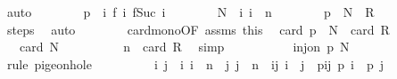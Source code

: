 \begin{isabellebody}
\ auto\isanewline
\ \ \ \ \ \ \isamarkupfalse%
\ {\isacharquery}{\kern0pt}p\ {\isacharequal}{\kern0pt}\ {\isachardoublequoteopen}{\isasymlambda}i{\isachardot}{\kern0pt}\ {\isacharparenleft}{\kern0pt}f\ i{\isacharcomma}{\kern0pt}\ f{\isacharparenleft}{\kern0pt}Suc\ i{\isacharparenright}{\kern0pt}{\isacharparenright}{\kern0pt}{\isachardoublequoteclose}\isanewline
\ \ \ \ \ \ \isamarkupfalse%
\ {\isacharquery}{\kern0pt}N\ {\isacharequal}{\kern0pt}\ {\isachardoublequoteopen}{\isacharbraceleft}{\kern0pt}i{\isachardot}{\kern0pt}\ i\ {\isasymle}\ n{\isacharbraceright}{\kern0pt}{\isachardoublequoteclose}\isanewline
\ \ \ \ \ \ \isamarkupfalse%
\ {\isachardoublequoteopen}{\isacharquery}{\kern0pt}p\ {\isacharbackquote}{\kern0pt}\ {\isacharquery}{\kern0pt}N\ {\isasymsubseteq}\ R{\isachardoublequoteclose}\isanewline
\ \ \ \ \ \ \ \ \isamarkupfalse%
\ steps\ \isamarkupfalse%
\ auto\isanewline
\ \ \ \ \ \ \isamarkupfalse%
\ card{\isacharunderscore}{\kern0pt}mono{\isacharbrackleft}{\kern0pt}OF\ assms{\isacharparenleft}{\kern0pt}{}{\isacharparenright}{\kern0pt}\ this{\isacharbrackright}{\kern0pt}\ \isamarkupfalse%
\ {\isachardoublequoteopen}card\ {\isacharparenleft}{\kern0pt}{\isacharquery}{\kern0pt}p\ {\isacharbackquote}{\kern0pt}\ {\isacharquery}{\kern0pt}N{\isacharparenright}{\kern0pt}\ {\isasymle}\ card\ R{\isachardoublequoteclose}\ \isacommand{{\isachardot}{\kern0pt}}\isamarkupfalse%
\isanewline
\ \ \ \ \ \ \isamarkupfalse%
\ \isamarkupfalse%
\ {\isachardoublequoteopen}{\isasymdots}\ {\isacharless}{\kern0pt}\ card\ {\isacharquery}{\kern0pt}N{\isachardoublequoteclose}\isanewline
\ \ \ \ \ \ \ \ \isamarkupfalse%
\ {\isacartoucheopen}n\ {\isacharequal}{\kern0pt}\ card\ R{\isacartoucheclose}\ \isamarkupfalse%
\ simp\isanewline
\ \ \ \ \ \ \isamarkupfalse%
\ \isamarkupfalse%
\ {\isachardoublequoteopen}{\isasymnot}\ inj{\isacharunderscore}{\kern0pt}on\ {\isacharquery}{\kern0pt}p\ {\isacharquery}{\kern0pt}N{\isachardoublequoteclose}\isanewline
\ \ \ \ \ \ \ \ \isamarkupfalse%
\ {\isacharparenleft}{\kern0pt}rule\ pigeonhole{\isacharparenright}{\kern0pt}\isanewline
\ \ \ \ \ \ \isamarkupfalse%
\ \isamarkupfalse%
\ i\ j\ \ i{\isacharcolon}{\kern0pt}\ {\isachardoublequoteopen}i\ {\isasymle}\ n{\isachardoublequoteclose}\ \ j{\isacharcolon}{\kern0pt}\ {\isachardoublequoteopen}j\ {\isasymle}\ n{\isachardoublequoteclose}\ \ ij{\isacharcolon}{\kern0pt}\ {\isachardoublequoteopen}i\ {\isasymnoteq}\ j{\isachardoublequoteclose}\ \ pij{\isacharcolon}{\kern0pt}\ {\isachardoublequoteopen}{\isacharquery}{\kern0pt}p\ i\ {\isacharequal}{\kern0pt}\ {\isacharquery}{\kern0pt}p\ j{\isachardoublequoteclose}\isanewline

\end{isabellebody}
